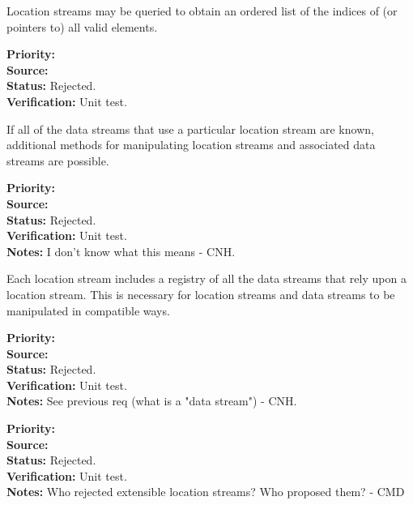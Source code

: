 
Location streams may be queried to obtain an ordered list of the indices of (or
pointers to) all valid elements.

\begin{reqlist}
{\bf Priority:} \\
{\bf Source:} \\
{\bf Status:} Rejected. \\
{\bf Verification:} Unit test. 
\end{reqlist}

If all of the data streams that use a particular location stream are known,
additional methods for manipulating location streams and associated data streams are
possible.
\begin{reqlist}
{\bf Priority:} \\
{\bf Source:} \\
{\bf Status:} Rejected. \\
{\bf Verification:} Unit test. \\
{\bf Notes:} I don't know what this means - CNH.
\end{reqlist}

Each location stream includes a registry of all the data streams that rely upon a
location stream.  This is necessary for location streams and data streams to be
manipulated in compatible ways.
\begin{reqlist}
{\bf Priority:}  \\
{\bf Source:} \\
{\bf Status:} Rejected. \\
{\bf Verification:} Unit test. \\
{\bf Notes:} See previous req (what is a "data stream") - CNH.
\end{reqlist}

\begin{reqlist}
{\bf Priority:}  \\
{\bf Source:} \\
{\bf Status:} Rejected. \\
{\bf Verification:} Unit test. \\
{\bf Notes:} Who rejected extensible location streams? Who proposed them? - CMD
\end{reqlist}

